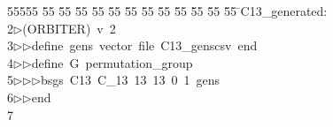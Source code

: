 %
%
\begin{tabbing}
55555 \= 55 \= 55 \= 55 \= 55 \= 55 \= 55 \= 55 \= 55 \= 55 \= 55 \= 55 \= 55 \= \>C13\_generated:\\[0pt]
2\>$\triangleright$\>(ORBITER)\ v\ 2\ \\[0pt]
3\>$\triangleright$\>$\triangleright$\>define\ gens\ vector\ file\ C13\_genscsv\ end\ \\[0pt]
4\>$\triangleright$\>$\triangleright$\>define\ G\ permutation\_group\ \\[0pt]
5\>$\triangleright$\>$\triangleright$\>$\triangleright$\>bsgs\ C13\ C\_13\ 13\ 13\ 0\ 1\ gens\ \\[0pt]
6\>$\triangleright$\>$\triangleright$\>end\ \\[0pt]
7\>\end{tabbing}
